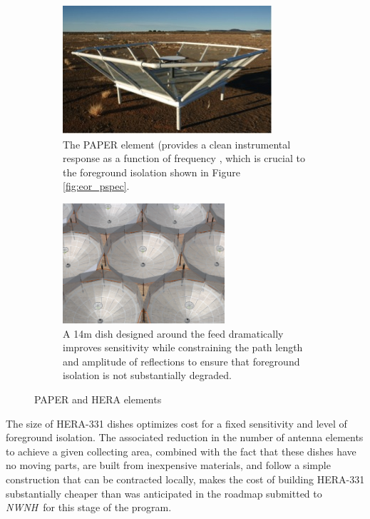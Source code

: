 \documentclass[preprint]{aastex}
\def\nwnh{{\sl NWNH}}
\begin{document}
\begin{figure}[!ht]
\centering
	\begin{subfigure}[b]{0.46\textwidth}
		\includegraphics[width=\textwidth]{plots/paper_element.jpg}
		\caption{The PAPER element (provides a clean instrumental response as a function
		of frequency \citep{parsons_et_al2010,parsons_et_al2012b}, which is crucial to
		the foreground isolation shown in Figure \ref{fig:eor_pspec}.}
	\end{subfigure}
	\quad
	\begin{subfigure}[b]{0.46\textwidth}
		\includegraphics[height=1.75in]{plots/hera_dish.png}
		\caption{A 14m dish designed around the feed dramatically improves sensitivity while
		constraining the path length and amplitude of reflections to ensure that foreground 
		isolation is not substantially degraded.}
	\end{subfigure}
\caption{PAPER and HERA elements}
\label{fig:hera_dish}
\end{figure}

The size of HERA-331 dishes optimizes cost for a fixed sensitivity and
level of foreground isolation.  The associated reduction in the number
of antenna elements to achieve a given collecting area, combined with
the fact that these dishes have no moving parts, are built from
inexpensive materials, and follow a simple construction that can be
contracted locally, makes the cost of building HERA-331 substantially
cheaper than was anticipated in the roadmap submitted to \nwnh\ for this
stage of the program.   
\end{document}
